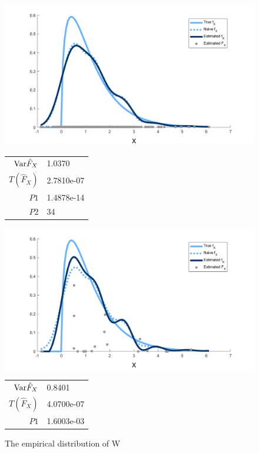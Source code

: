 \begin{figure}
	\begin{minipage}{0.5\textwidth}

		\centering
		\includegraphics[width = \textwidth]{Figures/Deconvolution/emp_masses_example.png}
		\begin{tabular}{r l}
			$\mathrm{Var} \hat{F}_X$ & 1.0370\\
			$T(\hat{F}_X)$ & 2.7810e-07\\
			$P1$ & 1.4878e-14\\
			$P2$ & 34
		\end{tabular}
		\caption{The empirical distribution of W}
		\label{fig:emp masses example}
	\end{minipage}
	\begin{minipage}{0.5\textwidth}
	\centering
		\includegraphics[width = \textwidth]{Figures/Deconvolution/moving_masses_m20_example.png}
		\begin{tabular}{r l}
			$\mathrm{Var} \hat{F}_X$ & 0.8401\\
			$T(\hat{F}_X)$ & 4.0700e-07\\
			$P1$ & 1.6003e-03\\

\end{tabular}
\end{minipage}
\end{figure}

